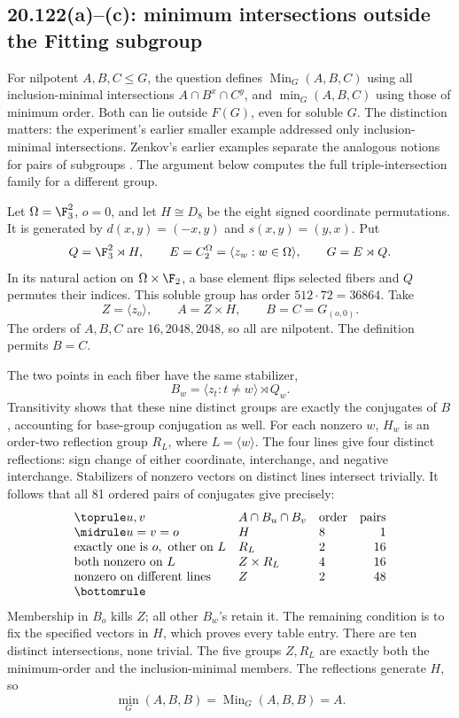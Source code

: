 \subsection{20.122(a)--(c): minimum intersections outside the Fitting subgroup}
\label{cand:20.122}
For nilpotent \(A,B,C\le G\), the question defines
\(\operatorname{Min}_G(A,B,C)\) using all inclusion-minimal
intersections \(A\cap B^x\cap C^y\), and \(\min_G(A,B,C)\) using
those of minimum order. Both can lie outside \(F(G)\), even for soluble
\(G\). The distinction matters: the experiment's earlier smaller
example addressed only inclusion-minimal intersections.
Zenkov's earlier examples separate the analogous notions for pairs
of subgroups \cite{zenkov-intersections}. The argument below
computes the full triple-intersection family for a different group.

Let \(\Omega=\F_3^2\), \(o=0\), and let \(H\cong D_8\) be the eight
signed coordinate permutations. It is generated by
\(d(x,y)=(-x,y)\) and \(s(x,y)=(y,x)\).
Put
\[
 Q=\F_3^2\rtimes H,\qquad
 E=C_2^\Omega=\langle z_w:w\in\Omega\rangle,\qquad
 G=E\rtimes Q.
\]
In its natural action on \(\Omega\times\F_2\), a base element flips
selected fibers and \(Q\) permutes their indices.
This soluble group has order \(512\cdot72=36864\).
Take
\[
 Z=\langle z_o\rangle,\qquad
 A=Z\times H,\qquad B=C=G_{(o,0)}.
\]
The orders of \(A,B,C\) are \(16,2048,2048\), so all are nilpotent.
The definition permits \(B=C\).

The two points in each fiber have the same stabilizer,
\[
 B_w=\langle z_t:t\ne w\rangle\rtimes Q_w.
\]
Transitivity shows that these nine distinct groups are exactly
the conjugates of \(B\), accounting for base-group conjugation as well.
For each nonzero \(w\), \(H_w\) is an order-two reflection group
\(R_L\), where \(L=\langle w\rangle\).
The four lines give four distinct reflections: sign change of either
coordinate, interchange, and negative interchange.
Stabilizers of nonzero vectors on distinct lines intersect trivially.
It follows that all 81 ordered pairs of conjugates give precisely:
\[
\begin{array}{lll r}
\toprule
u,v & A\cap B_u\cap B_v & \text{order}&\text{pairs}\\
\midrule
u=v=o&H&8&1\\
\text{exactly one is }o,\ \text{other on }L&R_L&2&16\\
\text{both nonzero on }L&Z\times R_L&4&16\\
\text{nonzero on different lines}&Z&2&48\\
\bottomrule
\end{array}
\]
Membership in \(B_o\) kills \(Z\); all other \(B_w\)'s retain it.
The remaining condition is to fix the specified vectors in \(H\),
which proves every table entry.
There are ten distinct intersections, none trivial.
The five groups \(Z,R_L\) are exactly both the minimum-order and
the inclusion-minimal members. The reflections generate \(H\), so
\[
 \min_G(A,B,B)=\operatorname{Min}_G(A,B,B)=A.
\]

